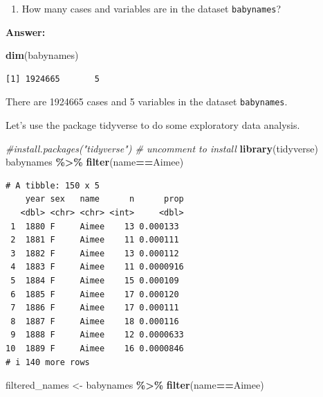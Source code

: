 \documentclass[
]{book}
\newenvironment{Shaded}{\begin{snugshade}}{\end{snugshade}}
\newcommand{\CommentTok}[1]{\textcolor[rgb]{0.56,0.35,0.01}{\textit{#1}}}
\newcommand{\FunctionTok}[1]{\textcolor[rgb]{0.13,0.29,0.53}{\textbf{#1}}}
\newcommand{\NormalTok}[1]{#1}
\newcommand{\OtherTok}[1]{\textcolor[rgb]{0.56,0.35,0.01}{#1}}
\newcommand{\SpecialCharTok}[1]{\textcolor[rgb]{0.81,0.36,0.00}{\textbf{#1}}}
\newcommand{\StringTok}[1]{\textcolor[rgb]{0.31,0.60,0.02}{#1}}
\providecommand{\tightlist}{%
  \setlength{\itemsep}{0pt}\setlength{\parskip}{0pt}}
\begin{document}
\begin{enumerate}
\def\labelenumi{\arabic{enumi}.}
\tightlist
\item
  How many cases and variables are in the dataset \texttt{babynames}?
\end{enumerate}

\textbf{Answer:}

\begin{Shaded}
\begin{Highlighting}[]
\FunctionTok{dim}\NormalTok{(babynames)}
\end{Highlighting}
\end{Shaded}

\begin{verbatim}
[1] 1924665       5
\end{verbatim}

There are 1924665 cases and 5 variables in the dataset \texttt{babynames}.

Let's use the package tidyverse to do some exploratory data analysis.

\begin{Shaded}
\begin{Highlighting}[]
\CommentTok{\#install.packages("tidyverse")   \# uncomment to install}
\FunctionTok{library}\NormalTok{(tidyverse)}
\NormalTok{babynames }\SpecialCharTok{\%\textgreater{}\%} \FunctionTok{filter}\NormalTok{(name}\SpecialCharTok{==}\StringTok{\textquotesingle{}Aimee\textquotesingle{}}\NormalTok{)}
\end{Highlighting}
\end{Shaded}

\begin{verbatim}
# A tibble: 150 x 5
    year sex   name      n      prop
   <dbl> <chr> <chr> <int>     <dbl>
 1  1880 F     Aimee    13 0.000133 
 2  1881 F     Aimee    11 0.000111 
 3  1882 F     Aimee    13 0.000112 
 4  1883 F     Aimee    11 0.0000916
 5  1884 F     Aimee    15 0.000109 
 6  1885 F     Aimee    17 0.000120 
 7  1886 F     Aimee    17 0.000111 
 8  1887 F     Aimee    18 0.000116 
 9  1888 F     Aimee    12 0.0000633
10  1889 F     Aimee    16 0.0000846
# i 140 more rows
\end{verbatim}

\begin{Shaded}
\begin{Highlighting}[]
\NormalTok{filtered\_names }\OtherTok{\textless{}{-}}\NormalTok{ babynames }\SpecialCharTok{\%\textgreater{}\%} \FunctionTok{filter}\NormalTok{(name}\SpecialCharTok{==}\StringTok{\textquotesingle{}Aimee\textquotesingle{}}\NormalTok{)}
\end{Highlighting}
\end{Shaded}
\end{document}
